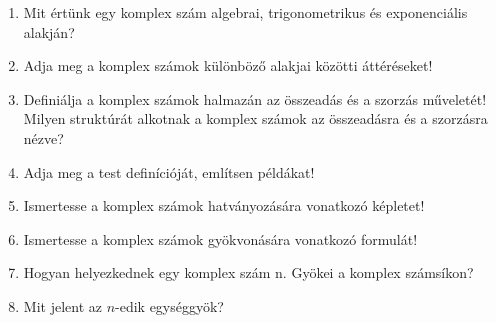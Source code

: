 \vfill
\begin{questions}[section.2.2]
  \begin{enumerate}
    \item Mit értünk egy komplex szám algebrai, trigonometrikus és exponenciális
          alakján?
    \item Adja meg a komplex számok különböző alakjai közötti áttéréseket!
    \item Definiálja a komplex számok halmazán az összeadás és a szorzás
          műveletét! Milyen struktúrát alkotnak a komplex számok az összeadásra
          és a szorzásra nézve?
    \item Adja meg a test definícióját, említsen példákat!
    \item Ismertesse a komplex számok hatványozására vonatkozó képletet!
    \item Ismertesse a komplex számok gyökvonására vonatkozó formulát!
    \item Hogyan helyezkednek egy komplex szám n. Gyökei a komplex számsíkon?
    \item Mit jelent az $n$-edik egységgyök?
  \end{enumerate}
\end{questions}